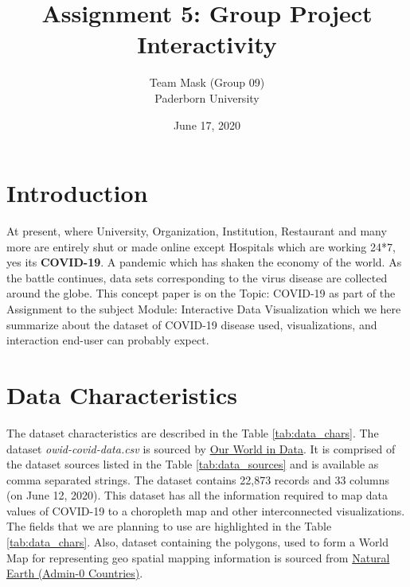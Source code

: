 \documentclass[10pt]{article}
\newcommand{\participant}{Team Mask (Group 09)}
\newcommand{\affiliation}{Paderborn University}
\newcommand{\topic}{Assignment 5: Group Project Interactivity}
\newcommand{\submissiondate}{June 17, 2020}
\begin{document}
\title{\topic}
\author{\Large{\participant}\\ \affiliation \\}
\date{\submissiondate}
\maketitle
\thispagestyle{empty}




\section{Introduction}

\color{black}
At present, where University, Organization, Institution, Restaurant and many more are entirely shut or made online except Hospitals which are working 24*7, yes its {\bf COVID-19}. A pandemic which has shaken the economy of the world. As the battle continues, data sets corresponding to the virus disease are collected around the globe. This concept paper is on the Topic: COVID-19 as part of the Assignment to the subject Module: Interactive Data Visualization which we here summarize about the dataset of COVID-19 disease used, visualizations, and interaction end-user can probably expect.

\section{Data Characteristics}

The dataset characteristics are described in the Table \ref{tab:data_chars}. The dataset \textit{owid-covid-data.csv} is sourced by \href{https://ourworldindata.org/coronavirus-testing}{Our World in Data}. It is comprised of the dataset sources listed in the Table \ref{tab:data_sources} and is available as comma separated strings. The dataset contains 22,873 records and 33 columns (on June 12, 2020). This dataset has all the information required to map data values of COVID-19 to a choropleth map and other interconnected visualizations. The fields that we are planning to use are highlighted in the Table \ref{tab:data_chars}. Also, dataset containing the polygons, used to form a World Map for representing geo spatial mapping information is sourced from \href{https://www.naturalearthdata.com/downloads/110m-cultural-vectors/110m-admin-0-countries/}{Natural Earth (Admin-0 Countries)}. 
\end{document}
